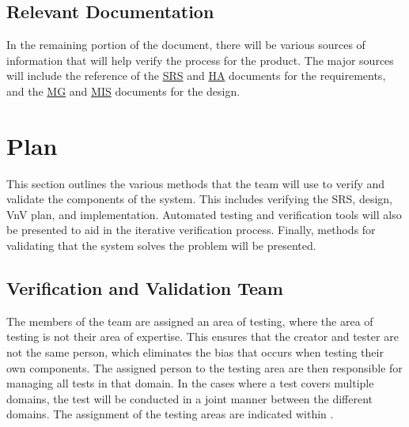 \documentclass[12pt, titlepage]{article}
\begin{document}
\subsection{Relevant Documentation}

In the remaining portion of the document, there will be various sources of information that will help verify the process for the product. The major sources will include the reference of the \href{https://github.com/icecap360/DroneCapstone/blob/master/docs/SRS/SRS.pdf}{SRS} and \href{https://github.com/icecap360/DroneCapstone/blob/master/docs/HazardAnalysis/HazardAnalysis.pdf}{HA} documents for the requirements, and the \href{https://github.com/icecap360/DroneCapstone/blob/master/docs/Design/MG/MG.pdf}{MG} and \href{https://github.com/icecap360/DroneCapstone/blob/master/docs/Design/MIS/MIS.pdf}{MIS} documents for the design.

\section{Plan}
\label{vnvPlan}

This section outlines the various methods that the team will use to verify and validate the components of the system. This includes verifying the SRS, design, VnV plan, and implementation. Automated testing and verification tools will also be presented to aid in the iterative verification process. Finally, methods for validating that the system solves the problem will be presented.

\subsection{Verification and Validation Team}

The members of the team are assigned an area of testing, where the area of testing is not their area of expertise. This ensures that the creator and tester are not the same person, which eliminates the bias that occurs when testing their own components. The assigned person to the testing area are then responsible for managing all tests in that domain. In the cases where a test covers multiple domains, the test will be conducted in a joint manner between the different domains. The assignment of the testing areas are indicated within .
  
\end{document}
